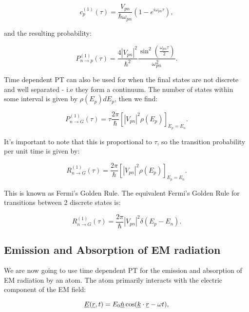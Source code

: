 \begin{equation}
    c^{(1)}_p(\tau) = \frac{V_{pn}}{\hbar \omega_{pn}} (1 - e^{i \omega_{pn} \tau}),
\end{equation}

\noindent and the resulting probability:

\begin{equation}
    P^{(1)}_{n \rightarrow p}(\tau) = \frac{4 |V_{pn}|^2}{\hbar^2} \frac{\sin^2(\frac{\omega_{pn} \tau}{2})}{\omega_{pn}^2}.
\end{equation}

\noindent Time dependent PT can also be used for when the final states are not discrete and well separated - i.e they form a continuum. The number of states within some interval is given by $\rho(E_p) dE_p$, then we find:

\begin{equation}
    P^{(1)}_{n \rightarrow G}(\tau) = \tau \frac{2\pi}{\hbar}[|V_{pn}|^2 \rho(E_p)]_{E_p = E_n}.
\end{equation}

\noindent It's important to note that this is proportional to $\tau$, so the transition probability per unit time is given by:

\begin{equation}
    R^{(1)}_{n \rightarrow G}(\tau) = \frac{2\pi}{\hbar}[|V_{pn}|^2 \rho(E_p)]_{E_p = E_n}.
    \label{FermiGoldenRuleContinuum}
\end{equation}

\noindent This is known as Fermi's Golden Rule. The equivalent Fermi's Golden Rule for transitions between 2 discrete states is:

\begin{equation}
    R^{(1)}_{n \rightarrow G}(\tau) = \frac{2\pi}{\hbar}|V_{pn}|^2 \delta(E_p - E_n).
\end{equation}

\subsection{Emission and Absorption of EM radiation}

We are now going to use time dependent PT for the emission and absorption of EM radiation by an atom. The atom primarily interacts with the electric component of the EM field:

\begin{equation}
    \underline{E}(\underline{r}, t) = E_0 \underline{\Hat{n}}\cos(\underline{k} \cdot \underline{r} - \omega t),
\end{equation}

